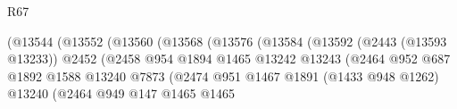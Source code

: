 \begin{lexlean}{R67}
\begin{coremodule}
                                                        (@13544
                                                          (@13552
                                                            (@13560
                                                              (@13568
                                                                (@13576
                                                                  (@13584
                                                                    (@13592
                                                                      (@2443 (@13593 @13233))
                                                                      @2452
                                                                      (@2458
                                                                        @954
                                                                        @1894
                                                                        @1465
                                                                        @13242
                                                                        @13243
                                                                        (@2464
                                                                          @952
                                                                          @687
                                                                          @1892
                                                                          @1588
                                                                          @13240
                                                                          @7873
                                                                          (@2474
                                                                            @951
                                                                            @1467
                                                                            @1891
                                                                            (@1433 @948 @1262)
                                                                            @13240
                                                                            (@2464
                                                                              @949
                                                                              @147
                                                                              @1465
                                                                              @1465

\end{coremodule}
\end{lexlean}

